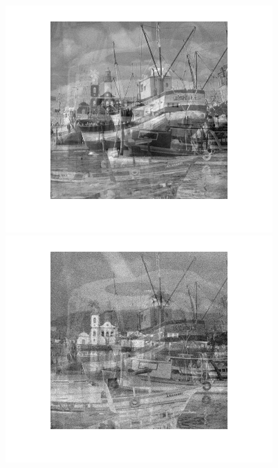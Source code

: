 \begin{figure}
{\begin{minipage}[b]{0.23\linewidth}
\includegraphics[width=1\linewidth]{images/efica_out1.png}\vspace{4pt}
\includegraphics[width=1\linewidth]{images/efica_out2.png}\vspace{4pt}

\end{minipage}}
\end{figure}

